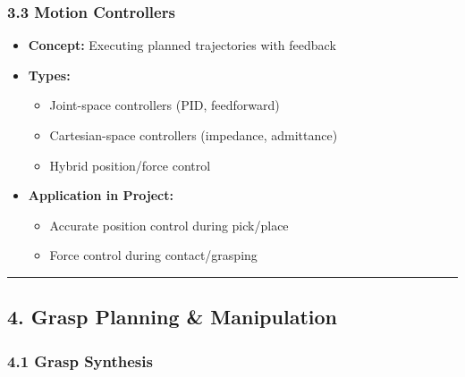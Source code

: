 \documentclass[
]{article}
\providecommand{\tightlist}{%
  \setlength{\itemsep}{0pt}\setlength{\parskip}{0pt}}
\begin{document}
\hypertarget{motion-controllers}{%
\subsubsection{3.3 Motion Controllers}\label{motion-controllers}}

\begin{itemize}
\tightlist
\item
  \textbf{Concept:} Executing planned trajectories with feedback
\item
  \textbf{Types:}

  \begin{itemize}
  \tightlist
  \item
    Joint-space controllers (PID, feedforward)
  \item
    Cartesian-space controllers (impedance, admittance)
  \item
    Hybrid position/force control
  \end{itemize}
\item
  \textbf{Application in Project:}

  \begin{itemize}
  \tightlist
  \item
    Accurate position control during pick/place
  \item
    Force control during contact/grasping
  \end{itemize}
\end{itemize}

\begin{center}\rule{0.5\linewidth}{0.5pt}\end{center}

\hypertarget{grasp-planning-manipulation}{%
\subsection{4. Grasp Planning \&
Manipulation}\label{grasp-planning-manipulation}}

\hypertarget{grasp-synthesis}{%
\subsubsection{4.1 Grasp Synthesis}\label{grasp-synthesis}}
\end{document}
